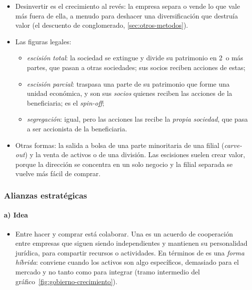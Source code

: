 \documentclass[11pt]{article}
\begin{document}
\begin{itemize}
\item Desinvertir es el crecimiento al revés: la empresa separa o vende lo que vale más fuera de ella, a menudo para deshacer una diversificación que destruía valor (el descuento de conglomerado, \ref{sec:otros-metodos}).
\item Las figuras legales\nocite{BOE2023RDL5}:
  \begin{itemize}
  \item \emph{escisión total}: la sociedad se extingue y divide su patrimonio en 2~o más partes, que pasan a otras sociedades; sus socios reciben acciones de estas;
  \item \emph{escisión parcial}: traspasa una parte de su patrimonio que forme una unidad económica, y son sus \emph{socios} quienes reciben las acciones de la beneficiaria; es el \emph{spin-off};
  \item \emph{segregación}: igual, pero las acciones las recibe la \emph{propia sociedad}, que pasa a ser accionista de la beneficiaria.
  \end{itemize}
\item Otras formas: la salida a bolsa de una parte minoritaria de una filial (\emph{carve-out}) y la venta de activos o de una división. Las escisiones suelen crear valor, porque la dirección se concentra en un solo negocio y la filial separada se vuelve más fácil de comprar\nocite{CusatisMilesWoolridge1993Restructuring}.
\end{itemize}

\subsubsection{Alianzas estratégicas}\label{sec:alianzas}

\paragraph{a) Idea}

\begin{itemize}
\item Entre hacer y comprar está colaborar. Una  es un acuerdo de cooperación entre empresas que siguen siendo independientes y mantienen su personalidad jurídica, para compartir recursos o actividades. En términos de  es una \emph{forma híbrida}: conviene cuando los activos son algo específicos, demasiado para el mercado y no tanto como para integrar (tramo intermedio del gráfico~\ref{fig:gobierno-crecimiento}).
\end{itemize}
\end{document}
